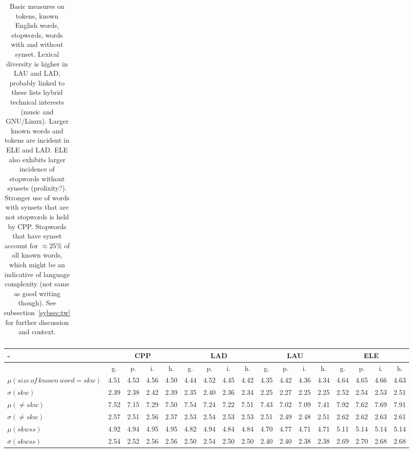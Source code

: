 \documentclass[%
 aip,
 jmp,%
 amsmath,amssymb,
 reprint,%
]{revtex4-1}
\begin{document}
\begin{table}
\begin{tabular}{|l|| c|c|c|c||  c|c|c|c||   c|c|c|c||   c|c|c|c|}
  \end{tabular}
  \caption{Basic measures on tokens, known English words, stopwords, words with and without synset. Lexical diversity is higher in LAU and LAD, probably linked to these lists hybrid technical interests (music and GNU/Linux). Larger known words and tokens are incident in ELE and LAD. ELE also exhibits larger incidence of stopwords without synsets (prolixity?). Stronger use of words with synsets that are not stopwords is held by CPP. Stopwords that have synset account for $\approx25\%$ of all known words, which might be an indicative of language complexity (not same as good writing though). See subsection~\ref{sybsec:tw} for further discussion and context.}
  \label{tab:tokens}
\end{table}

\begin{table}
\footnotesize
\setlength{\tabcolsep}{.56667em}
  \centering
  \begin{tabular}{|l|| c|c|c|c||  c|c|c|c||   c|c|c|c||   c|c|c|c|}\hline
-\-  & \multicolumn{4}{c|}{CPP} & \multicolumn{4}{c|}{LAD} & \multicolumn{4}{c|}{LAU} & \multicolumn{4}{c|}{ELE} \\ \hline
 & g. & p. & i. & h. &     g. & p. & i. & h. &    g. & p. & i. & h. &    g. & p. & i. & h. \\\hline
$\mu(size\,of\,known\,word=skw)$ & 4.51 & 4.53 & 4.56 & 4.50 & 4.44 & 4.52 & 4.45 & 4.42 & 4.35 & 4.42 & 4.36 & 4.34 & 4.64 & 4.65 & 4.66 & 4.63 \\
$\sigma(skw)$ & 2.39 & 2.38 & 2.42 & 2.39 & 2.35 & 2.40 & 2.36 & 2.34 & 2.25 & 2.27 & 2.25 & 2.25 & 2.52 & 2.54 & 2.53 & 2.51 \\
$\mu(\neq skw)$ & 7.52 & 7.15 & 7.29 & 7.50 & 7.54 & 7.24 & 7.22 & 7.51 & 7.43 & 7.02 & 7.09 & 7.41 & 7.92 & 7.62 & 7.69 & 7.91 \\
$\sigma(\neq skw)$ & 2.57 & 2.51 & 2.56 & 2.57 & 2.53 & 2.54 & 2.53 & 2.53 & 2.51 & 2.49 & 2.48 & 2.51 & 2.62 & 2.62 & 2.63 & 2.61 \\ \hline
$\mu(skwss)$ & 4.92 & 4.94 & 4.95 & 4.95 & 4.82 & 4.94 & 4.84 & 4.84 & 4.70 & 4.77 & 4.71 & 4.71 & 5.11 & 5.14 & 5.14 & 5.14 \\
$\sigma(skwss)$ & 2.54 & 2.52 & 2.56 & 2.56 & 2.50 & 2.54 & 2.50 & 2.50 & 2.40 & 2.40 & 2.38 & 2.38 & 2.69 & 2.70 & 2.68 & 2.68 \\

\end{tabular}
\end{table}
\end{document}
